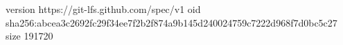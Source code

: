 version https://git-lfs.github.com/spec/v1
oid sha256:abcea3c2692fc29f34ee7f2b2f874a9b145d240024759c7222d968f7d0bc5c27
size 191720
